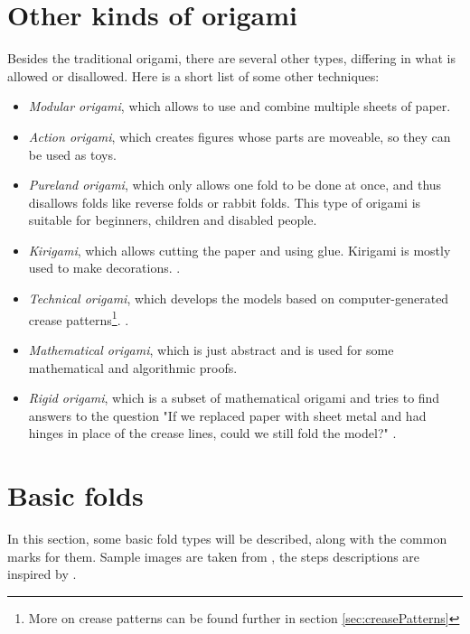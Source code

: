\section{Other kinds of origami}
Besides the traditional origami, there are several other types, differing in what is allowed or disallowed. Here is a short list of some other techniques:
\begin{itemize}
\item \emph{Modular origami}, which allows to use and combine multiple sheets of paper. \cite{fuse}
\item \emph{Action origami}, which creates figures whose parts are moveable, so they can be used as toys. \cite{lang2}
\item \emph{Pureland origami}, which only allows one fold to be done at once, and thus disallows folds like reverse folds or rabbit folds. This type of origami is suitable for beginners, children and disabled people. \cite{smith}
\item \emph{Kirigami}, which allows cutting the paper and using glue. Kirigami is mostly used to make decorations. \cite{temko2}.
\item \emph{Technical origami}, which develops the models based on computer-generated crease patterns\footnote{More on crease patterns can be found further in section \ref{sec:creasePatterns}}. \cite{mobilereference}.
\item \emph{Mathematical origami}, which is just abstract and is used for some mathematical and algorithmic proofs.
\item \emph{Rigid origami}, which is a subset of mathematical origami and tries to find answers to the question "If we replaced paper with sheet metal and had hinges in place of the crease lines, could we still fold the model?" \cite{mobilereference}.
\end{itemize}

\section{Basic folds}
\label{sec:basicFolds}
In this section, some basic fold types will be described, along with the common marks for them. Sample images are taken from \cite{folds}, the steps descriptions are inspired by \cite{lang}.

